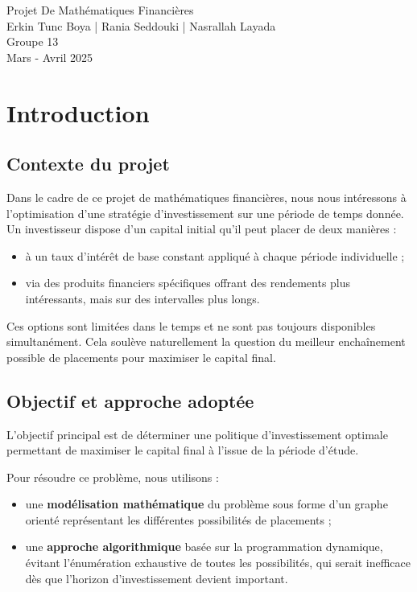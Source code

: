 \documentclass[a4paper,11pt]{article}
\begin{document}
\begin{center}
	\Huge{Projet De Mathématiques Financières}\\[0.5cm]
	\Large{Erkin Tunc Boya | Rania Seddouki |  Nasrallah Layada }\\ [0.2cm]
	\Large{Groupe 13} \\[0.2cm]
	\Large{Mars - Avril 2025}
\end{center}

\tableofcontents
\section{Introduction}

\subsection{Contexte du projet}

Dans le cadre de ce projet de mathématiques financières, nous nous intéressons à l’optimisation d’une stratégie d’investissement sur une période de temps donnée. Un investisseur dispose d’un capital initial qu’il peut placer de deux manières :
\begin{itemize}
	\item à un taux d’intérêt de base constant appliqué à chaque période individuelle ;
	\item via des produits financiers spécifiques offrant des rendements plus intéressants, mais sur des intervalles plus longs.
\end{itemize}

Ces options sont limitées dans le temps et ne sont pas toujours disponibles simultanément. Cela soulève naturellement la question du meilleur enchaînement possible de placements pour maximiser le capital final.

\subsection{Objectif et approche adoptée}

L’objectif principal est de déterminer une politique d’investissement optimale permettant de maximiser le capital final à l’issue de la période d’étude.

Pour résoudre ce problème, nous utilisons :
\begin{itemize}
	\item une \textbf{modélisation mathématique} du problème sous forme d’un graphe orienté représentant les différentes possibilités de placements ;
	\item une \textbf{approche algorithmique} basée sur la programmation dynamique, évitant l’énumération exhaustive de toutes les possibilités, qui serait inefficace dès que l’horizon d’investissement devient important.
\end{itemize}
\end{document}

